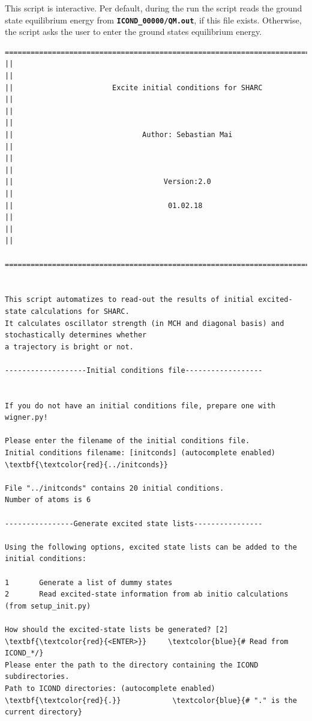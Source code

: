 \documentclass[a4paper,11pt,DIV=15,openany]{scrbook}
\newcommand{\ttt}[1]{\textbf{\texttt{#1}}}
\begin{document}
This script is interactive. 
Per default, during the run the script reads the ground state equilibrium energy from \ttt{ICOND\_00000/QM.out}, if this file exists. 
Otherwise, the script asks the user to enter the ground states equilibrium energy.

\begin{oframed}
\footnotesize\begin{Verbatim}[commandchars=\\\{\}]
  ================================================================================
||                                                                                ||
||                       Excite initial conditions for SHARC                      ||
||                                                                                ||
||                              Author: Sebastian Mai                             ||
||                                                                                ||
||                                   Version:2.0                                  ||
||                                    01.02.18                                    ||
||                                                                                ||
  ================================================================================


This script automatizes to read-out the results of initial excited-state calculations for SHARC.
It calculates oscillator strength (in MCH and diagonal basis) and stochastically determines whether
a trajectory is bright or not.
  
-------------------Initial conditions file------------------


If you do not have an initial conditions file, prepare one with wigner.py!

Please enter the filename of the initial conditions file.
Initial conditions filename: [initconds] (autocomplete enabled) \textbf{\textcolor{red}{../initconds}}

File "../initconds" contains 20 initial conditions.
Number of atoms is 6

----------------Generate excited state lists----------------

Using the following options, excited state lists can be added to the initial conditions:

1       Generate a list of dummy states
2       Read excited-state information from ab initio calculations (from setup_init.py)

How should the excited-state lists be generated? [2] \textbf{\textcolor{red}{<ENTER>}}     \textcolor{blue}{# Read from ICOND_*/}
Please enter the path to the directory containing the ICOND subdirectories.
Path to ICOND directories: (autocomplete enabled) \textbf{\textcolor{red}{.}}            \textcolor{blue}{# "." is the current directory}


\end{Verbatim}
\end{oframed}
\end{document}
